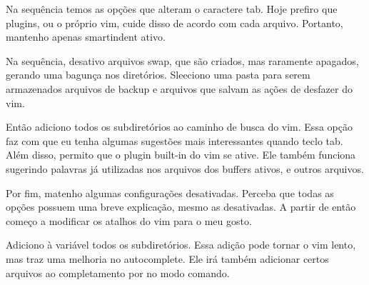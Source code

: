 Na sequência temos as opções que alteram o caractere tab.
Hoje prefiro que plugins, ou o próprio vim, cuide disso de acordo com cada arquivo.
Portanto, mantenho apenas smartindent ativo.

Na sequência, desativo arquivos swap, que são criados, mas raramente apagados, gerando uma bagunça nos diretórios.
Sleeciono uma pasta para serem armazenados arquivos de backup e arquivos que salvam as ações de desfazer do vim.

Então adiciono todos os subdiretórios ao caminho de busca do vim.
Essa opção faz com que eu tenha algumas sugestões mais interessantes quando teclo tab.
Além disso, permito que o plugin built-in do vim se ative.
Ele também funciona sugerindo palavras já utilizadas nos arquivos dos buffers ativos, e outros arquivos.

Por fim, matenho algumas configurações desativadas.
Perceba que todas as opções possuem uma breve explicação, mesmo as desativadas.
A partir de então começo a modificar os atalhos do vim para o meu gosto.


Adiciono à variável  todos os subdiretórios.
Essa adição pode tornar o vim lento, mas traz uma melhoria no autocomplete.
Ele irá também adicionar certos arquivos ao completamento por  no modo comando.

\newpage
